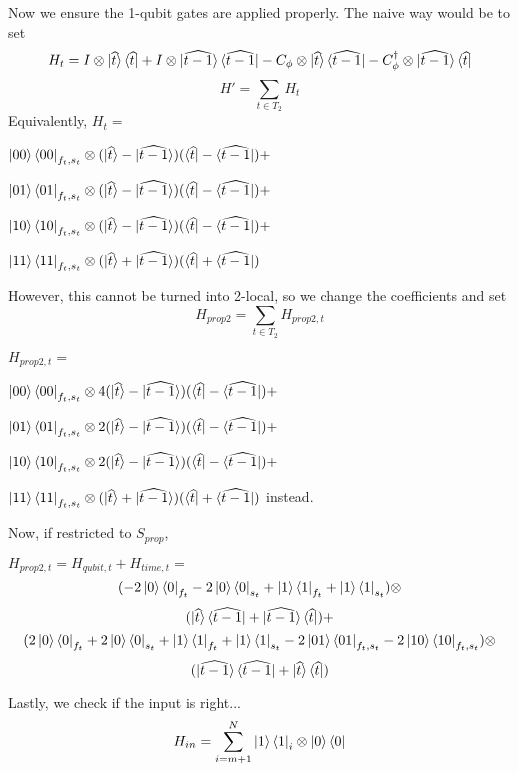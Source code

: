 Now we ensure the 1-qubit gates are applied properly. The naive way would be to set
	$$H_t=I\otimes\ket{\widehat t}\bra{\widehat t}
		+I\otimes\ket{\widehat{t-1}}\bra{\widehat{t-1}}
		-C_\phi\otimes\ket{\widehat t}\bra{\widehat{t-1}}
		-C_\phi^\dagger\otimes\ket{\widehat{t-1}}\bra{\widehat{t}}$$
	$$H'=\sum_{t\in T_2}H_t$$
	Equivalently, $H_t=$

	$\ket{00}\bra{00}_{f_t,s_t}\otimes
		(\ket{\widehat{t}}-\ket{\widehat{t-1}})
		(\bra{\widehat{t}}-\bra{\widehat{t-1}})+$

	$\ket{01}\bra{01}_{f_t,s_t}\otimes
		(\ket{\widehat{t}}-\ket{\widehat{t-1}})
		(\bra{\widehat{t}}-\bra{\widehat{t-1}})+$

	$\ket{10}\bra{10}_{f_t,s_t}\otimes
		(\ket{\widehat{t}}-\ket{\widehat{t-1}})
		(\bra{\widehat{t}}-\bra{\widehat{t-1}})+$

	$\ket{11}\bra{11}_{f_t,s_t}\otimes
		(\ket{\widehat{t}}+\ket{\widehat{t-1}})
		(\bra{\widehat{t}}+\bra{\widehat{t-1}})$

However, this cannot be turned into 2-local, so we change the coefficients and set 
	$$H_{prop2}=\sum_{t\in T_2}H_{prop2,t}$$

	$H_{prop2,t}=$

	$\ket{00}\bra{00}_{f_t,s_t}\otimes
		4(\ket{\widehat{t}}-\ket{\widehat{t-1}})
		(\bra{\widehat{t}}-\bra{\widehat{t-1}})+$

	$\ket{01}\bra{01}_{f_t,s_t}\otimes
		2(\ket{\widehat{t}}-\ket{\widehat{t-1}})
		(\bra{\widehat{t}}-\bra{\widehat{t-1}})+$

	$\ket{10}\bra{10}_{f_t,s_t}\otimes
		2(\ket{\widehat{t}}-\ket{\widehat{t-1}})
		(\bra{\widehat{t}}-\bra{\widehat{t-1}})+$

	$\ket{11}\bra{11}_{f_t,s_t}\otimes
		(\ket{\widehat{t}}+\ket{\widehat{t-1}})
		(\bra{\widehat{t}}+\bra{\widehat{t-1}})$
instead.

Now, if restricted to $S_{prop}$,

	$H_{prop2,t}=H_{qubit,t}+H_{time,t}=$
	$$(-2\ket{0}\bra{0}_{f_t}-2\ket{0}\bra{0}_{s_t}
		+\ket{1}\bra{1}_{f_t}+\ket{1}\bra{1}_{s_t})\otimes$$
	$$(\ket{\widehat{t}}\bra{\widehat{t-1}}+
		\ket{\widehat{t-1}}\bra{\widehat{t}})+$$
	$$(2\ket{0}\bra{0}_{f_t}+2\ket{0}\bra{0}_{s_t}
		+\ket{1}\bra{1}_{f_t}+\ket{1}\bra{1}_{s_t}
		-2\ket{01}\bra{01}_{f_t,s_t}
		-2\ket{10}\bra{10}_{f_t,s_t})\otimes$$
	$$(\ket{\widehat{t-1}}\bra{\widehat{t-1}}+
		\ket{\widehat{t}}\bra{\widehat{t}})$$


Lastly, we check if the input is right...
	$$H_{in}=\sum_{i=m+1}^N\ket{1}\bra{1}_i\otimes\ket{0}\bra{0}$$

